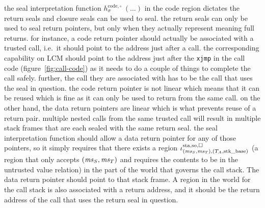\documentclass[acmsmall,review,anonymous]{acmart}\settopmatter{printfolios=true,printccs=false,printacmref=false}
\newcommand{\trgcm}{\textsc{LCM}}
\begin{document}

the seal interpretation function $h^\mathrm{code,\square}_\sigma \; (\dots)$ in the code region dictates the return seals and closure seals can be used to seal.
the return seals can only be used to seal return pointers, but only when they actually represent meaning full returns.
for instance, a code return pointer should actually be associated with a trusted call, i.e.\ it should point to the address just after a call.
the corresponding capability on \trgcm{} should point to the address just after the \texttt{xjmp} in the call code (figure~\ref{fig:call-code}) as it needs to do a couple of things to complete the call safely.
further, the call they are associated with has to be the call that uses the seal in question.
the code return pointer is not linear which means that it can be reused which is fine as it can only be used to return from the same call.
on the other hand, the data return pointers are linear which is what prevents reuse of a return pair.
multiple nested calls from the same trusted call will result in multiple stack frames that are each sealed with the same return seal.
the seal interpretation function should allow a data return pointer for any of those pointers, so it simply requires that there exists a region $\stareg[(\ms_S,\ms_T),(\ta,\stkb)]{\spao,\square}$ (a region that only accepts $(\ms_S,\ms_T)$ and requires the contents to be in the untrusted value relation) in the part of the world that governs the call stack.
The data return pointer should point to that stack frame.
A region in the world for the call stack is also associated with a return address, and it should be the return address of the call that uses the return seal in question.
\end{document}
